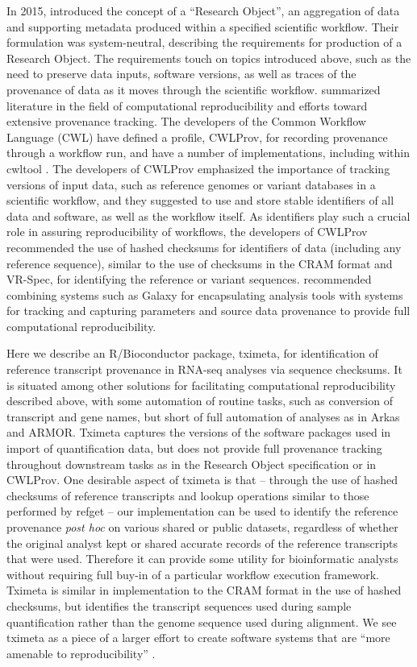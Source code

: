 \documentclass[12pt]{article} \usepackage[utf8]{inputenc}
\begin{document}
In 2015, \citet{Belhajjame2015} introduced the concept of a ``Research
Object'', an aggregation of data and supporting metadata produced
within a specified scientific workflow. Their formulation was
system-neutral, describing the requirements for production of a
Research Object. The requirements touch on topics introduced above,
such as the need to preserve data inputs, software versions, as well
as traces of the provenance of data as it moves through the scientific
workflow. \citet{Belhajjame2015} summarized literature in the field of
computational reproducibility and efforts toward extensive provenance
tracking. The developers of the Common Workflow Language (CWL) \citep{cwl}
have defined a profile, CWLProv, for recording provenance through a
workflow run, and have a number of implementations, including within
cwltool \citep{Khan2018}. The developers of CWLProv emphasized the
importance of tracking versions of input data, such as reference
genomes or variant databases in a scientific workflow, and they
suggested to use and store stable identifiers of all data and software,
as well as the workflow itself. As identifiers play such a crucial
role in assuring reproducibility of workflows, the developers of
CWLProv recommended the use of hashed checksums for identifiers of data
(including any reference sequence), similar to the use of checksums in
the CRAM format and VR-Spec, for identifying the reference or variant
sequences. \citet{Gruning2018} recommended combining systems such as
Galaxy for encapsulating analysis tools with systems for tracking and
capturing parameters and source data provenance to provide full
computational reproducibility.

Here we describe an R/Bioconductor package, tximeta, for identification
of reference transcript provenance in RNA-seq analyses via sequence
checksums. It is situated among other solutions for facilitating
computational reproducibility described above, with some automation of
routine tasks, such as conversion of transcript and gene names, but
short of full automation of analyses as in Arkas and ARMOR. Tximeta
captures the versions of the software packages used in import of
quantification data, but does not provide full provenance tracking
throughout downstream tasks as in the Research Object specification or
in CWLProv. One desirable aspect of tximeta is that -- through the use
of hashed checksums of reference transcripts and lookup operations
similar to those performed by refget -- our implementation can be used
to identify the reference provenance \textit{post hoc} on various
shared or public datasets, regardless of whether the original analyst
kept or shared accurate records of the reference transcripts that were
used. Therefore it can provide some utility for bioinformatic analysts
without requiring full buy-in of a particular workflow execution
framework.
Tximeta is similar in implementation to the CRAM format in the use
of hashed checksums, but identifies the transcript sequences used
during sample quantification rather than the genome sequence used
during alignment.
We see tximeta as a piece of a larger
effort to create software systems that are ``more amenable to
reproducibility'' \citep{Peng2011}.
\end{document}
